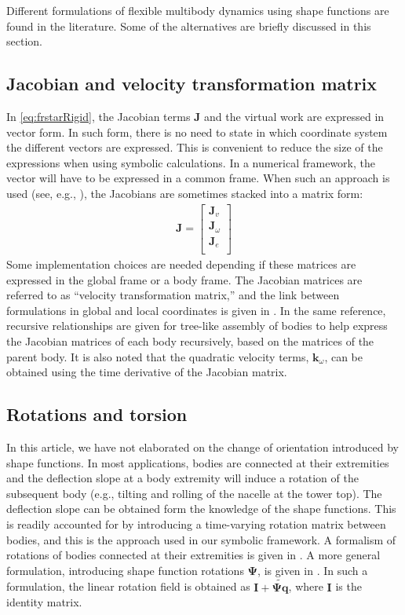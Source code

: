 \documentclass[wes, manuscript]{copernicus}
\renewcommand{\v}[1]{\boldsymbol{#1}}
\newcommand{\m}[1]{\boldsymbol{#1}}
\begin{document}
Different formulations of flexible multibody dynamics using shape functions are found in the literature.
Some of the alternatives are briefly discussed in this section.


\subsection{Jacobian and velocity transformation matrix}
In \autoref{eq:frstarRigid}, the Jacobian terms $\v{J}$ and the virtual work are expressed in vector form.
In such form, there is no need to state in which coordinate system the different vectors are expressed.
This is convenient to reduce the size of the expressions when using symbolic calculations.
In a numerical framework, the vector will have to be expressed in a common frame.
When such an approach is used (see, e.g., \cite{Lemmer:2018, branlard:2019flex}), the Jacobians are sometimes stacked into a matrix form:
\begin{align}
\m{J} = 
    \begin{bmatrix}
    \v{J}_v \\
    \v{J}_\omega\\
    \v{J}_e \\
    \end{bmatrix}
\end{align}
Some implementation choices are needed depending if these matrices are expressed in the global frame or a body frame.
    The Jacobian matrices are referred to as ``velocity transformation matrix,'' and the link between formulations in global and local coordinates is given in \cite{branlard:2019flex}.
    In the same reference, recursive relationships are given for tree-like assembly of bodies to help express the Jacobian matrices of each body recursively, based on the matrices of the parent body.
    It is also noted that the quadratic velocity terms, $\v{k}_\omega$, can be obtained using the time derivative of the Jacobian matrix.

\subsection{Rotations and torsion}
In this article, we have not elaborated on the change of orientation introduced by shape functions.
In most applications, bodies are connected at their extremities and the deflection slope at a body extremity will induce a rotation of the subsequent body (e.g., tilting and rolling of the nacelle at the tower top).
The deflection slope can be obtained form the knowledge of the shape functions.
This is readily accounted for by introducing a time-varying rotation matrix between bodies, and this is the approach used in our symbolic framework.
A formalism of rotations of bodies connected at their extremities is given in \cite{branlard:2019flex}.
A more general formulation, introducing shape function rotations $\m{\Psi}$, is given in \citep{Wallrapp:1994, Schwertassek:book, Lemmer:2018}.
In such a formulation, the linear rotation field is obtained as $\m{I}+\m{\widetilde{\m{\Psi}\v{q}}}$, where $\m{I}$ is the identity matrix.
\end{document}
